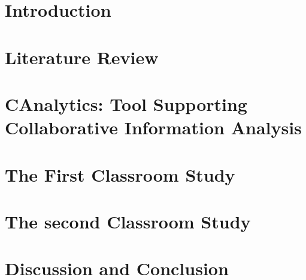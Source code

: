\documentclass[11pt]{psuthesis}
\begin{document}


\chapter{Introduction}


\chapter{Literature Review}




\chapter{CAnalytics: Tool Supporting \\ Collaborative Information Analysis}





\chapter{The First Classroom Study}







\chapter{The second Classroom Study}






\chapter{Discussion and Conclusion}



\end{document}
